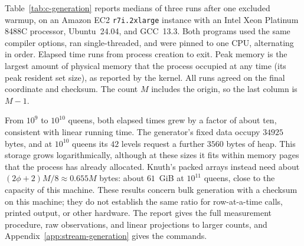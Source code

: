 Table~\ref{tab:c-generation} reports medians of three runs after one
excluded warmup, on an Amazon EC2 \texttt{r7i.2xlarge} instance with
an Intel Xeon Platinum 8488C processor, Ubuntu~24.04, and GCC~13.3.
Both programs used the same compiler options, ran single-threaded,
and were pinned to one CPU, alternating in order. Elapsed time runs
from process creation to exit. Peak memory is the largest amount of
physical memory that the process occupied at any time (its peak
resident set size), as reported by the kernel. All runs agreed on the final coordinate and checksum. The
count $M$ includes the origin, so the last column is $M-1$.

From $10^9$ to $10^{10}$ queens, both elapsed times grew by a factor
of about ten, consistent with linear running time. The generator's
fixed data occupy $34925$ bytes, and at $10^{10}$ queens its $42$
levels request a further $3560$ bytes of heap. This storage grows
logarithmically, although at these sizes it fits within memory pages
that the process has already allocated. Knuth's packed arrays instead
need about $(2\phi+2)M/8\approx0.655M$ bytes: about $61$~GiB at
$10^{11}$ queens, close to the capacity of this machine. These results
concern bulk generation with a checksum on this machine; they do not
establish the same ratio for row-at-a-time calls, printed output, or
other hardware. The report  gives the full measurement
procedure, raw observations, and linear projections to larger counts,
and Appendix~\ref{app:stream-generation} gives the commands.
